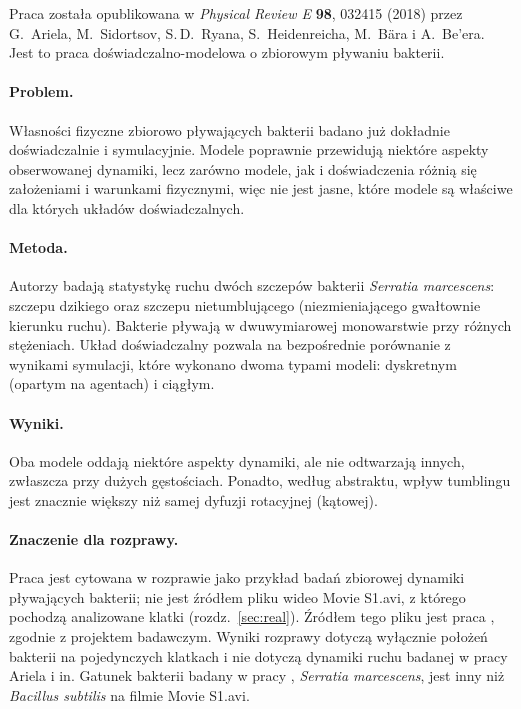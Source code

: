 \documentclass[12pt,a4paper,twoside,openright]{report}
\theoremstyle{definition}
\theoremstyle{remark}
\begin{document}
Praca \cite{ariel2018collective} została opublikowana w \emph{Physical Review E} \textbf{98}, 032415 (2018) przez G.~Ariela, M.~Sidortsov, S.\,D.~Ryana, S.~Heidenreicha, M.~Bära i A.~Be'era. Jest to praca doświadczalno-modelowa o zbiorowym pływaniu bakterii.

\paragraph{Problem.} Własności fizyczne zbiorowo pływających bakterii badano już dokładnie doświadczalnie i symulacyjnie. Modele poprawnie przewidują niektóre aspekty obserwowanej dynamiki, lecz zarówno modele, jak i doświadczenia różnią się założeniami i warunkami fizycznymi, więc nie jest jasne, które modele są właściwe dla których układów doświadczalnych.

\paragraph{Metoda.} Autorzy badają statystykę ruchu dwóch szczepów bakterii \emph{Serratia marcescens}: szczepu dzikiego oraz szczepu nietumblującego (niezmieniającego gwałtownie kierunku ruchu). Bakterie pływają w dwuwymiarowej monowarstwie przy różnych stężeniach. Układ doświadczalny pozwala na bezpośrednie porównanie z wynikami symulacji, które wykonano dwoma typami modeli: dyskretnym (opartym na agentach) i ciągłym.

\paragraph{Wyniki.} Oba modele oddają niektóre aspekty dynamiki, ale nie odtwarzają innych, zwłaszcza przy dużych gęstościach. Ponadto, według abstraktu, wpływ tumblingu jest znacznie większy niż samej dyfuzji rotacyjnej (kątowej).

\paragraph{Znaczenie dla rozprawy.} Praca \cite{ariel2018collective} jest cytowana w rozprawie jako przykład badań zbiorowej dynamiki pływających bakterii; nie jest źródłem pliku wideo Movie S1.avi, z którego pochodzą analizowane klatki (rozdz.~\ref{sec:real}). Źródłem tego pliku jest praca \cite{ryan2013kinetic}, zgodnie z projektem badawczym. Wyniki rozprawy dotyczą wyłącznie położeń bakterii na pojedynczych klatkach i nie dotyczą dynamiki ruchu badanej w pracy Ariela i in. Gatunek bakterii badany w pracy \cite{ariel2018collective}, \emph{Serratia marcescens}, jest inny niż \emph{Bacillus subtilis} na filmie Movie S1.avi.
\end{document}
